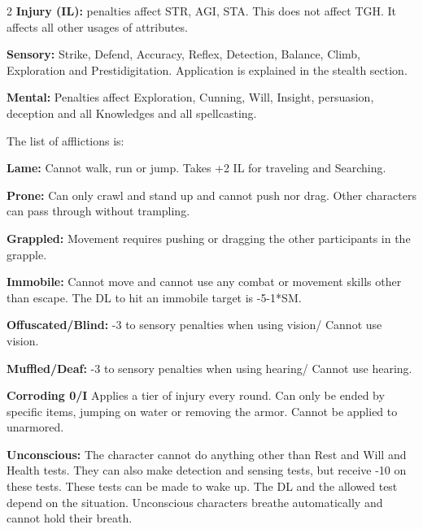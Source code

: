 \begin{multicols}{2}
\textbf{Injury (IL):} penalties affect STR, AGI, STA. This does not affect TGH. It affects all other usages of attributes.

\textbf{Sensory:} Strike, Defend, Accuracy, Reflex, Detection, Balance, Climb, Exploration and Prestidigitation. Application is explained in the stealth section.

\textbf{Mental:} Penalties affect Exploration, Cunning, Will, Insight, persuasion, deception and all Knowledges and all spellcasting.


The list of afflictions is:

\begin{proplist}
\item \textbf{Lame:} Cannot walk, run or jump. Takes +2 IL for traveling and Searching.
\item \textbf{Prone:} Can only crawl and stand up and cannot push nor drag. Other characters can pass through without trampling.
\item \textbf{Grappled:} Movement requires pushing or dragging the other participants in the grapple.
\item \textbf{Immobile:} Cannot move and cannot use any combat or movement skills other than escape. The DL to hit an immobile target is -5-1*SM.
\item \textbf{Offuscated/Blind:} -3 to sensory penalties when using vision/ Cannot use vision.
\item \textbf{Muffled/Deaf:} -3 to sensory penalties when using hearing/ Cannot use hearing. 

\item \textbf{Corroding 0/I} Applies a tier of injury every round. Can only be ended by specific items, jumping on water or removing the armor. Cannot be applied to unarmored.

\item \textbf{Unconscious:} The character cannot do anything other than Rest and Will and Health tests. They can also make detection and sensing tests, but receive -10 on these tests. These tests can be made to wake up. The DL and the allowed test depend on the situation. Unconscious characters breathe automatically and cannot hold their breath. 


\end{proplist}
\end{multicols}
